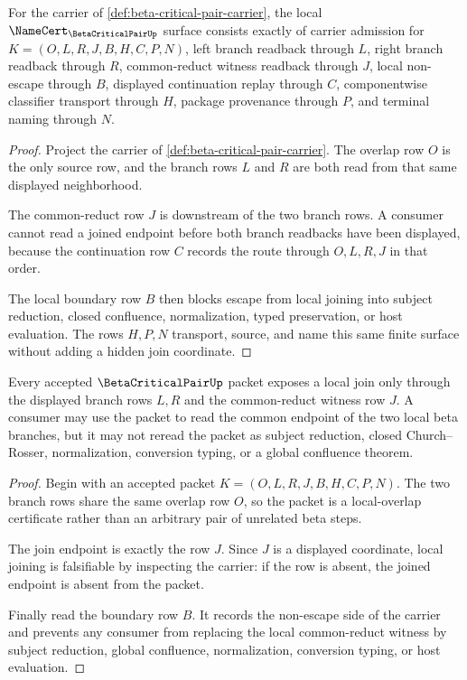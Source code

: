 \begin{theorem}
\label{thm:beta-critical-pair-namecert-obligations}
For the carrier of \autoref{def:beta-critical-pair-carrier}, the local $\NameCert_{\BetaCriticalPairUp}$ surface consists exactly of carrier admission for $K=(O,L,R,J,B,H,C,P,N)$, left branch readback through $L$, right branch readback through $R$, common-reduct witness readback through $J$, local non-escape through $B$, displayed continuation replay through $C$, componentwise classifier transport through $H$, package provenance through $P$, and terminal naming through $N$.
\end{theorem}
\begin{proof}
Project the carrier of \autoref{def:beta-critical-pair-carrier}. The overlap row $O$ is the only source row, and the branch rows $L$ and $R$ are both read from that same displayed neighborhood.

The common-reduct row $J$ is downstream of the two branch rows. A consumer cannot read a joined endpoint before both branch readbacks have been displayed, because the continuation row $C$ records the route through $O,L,R,J$ in that order.

The local boundary row $B$ then blocks escape from local joining into subject reduction, closed confluence, normalization, typed preservation, or host evaluation. The rows $H,P,N$ transport, source, and name this same finite surface without adding a hidden join coordinate.
\end{proof}

\begin{theorem}
\label{thm:beta-critical-pair-local-join-boundary}
Every accepted $\BetaCriticalPairUp$ packet exposes a local join only through the displayed branch rows $L,R$ and the common-reduct witness row $J$. A consumer may use the packet to read the common endpoint of the two local beta branches, but it may not reread the packet as subject reduction, closed Church--Rosser, normalization, conversion typing, or a global confluence theorem.
\end{theorem}
\begin{proof}
Begin with an accepted packet $K=(O,L,R,J,B,H,C,P,N)$. The two branch rows share the same overlap row $O$, so the packet is a local-overlap certificate rather than an arbitrary pair of unrelated beta steps.

The join endpoint is exactly the row $J$. Since $J$ is a displayed coordinate, local joining is falsifiable by inspecting the carrier: if the row is absent, the joined endpoint is absent from the packet.

Finally read the boundary row $B$. It records the non-escape side of the carrier and prevents any consumer from replacing the local common-reduct witness by subject reduction, global confluence, normalization, conversion typing, or host evaluation.
\end{proof}

